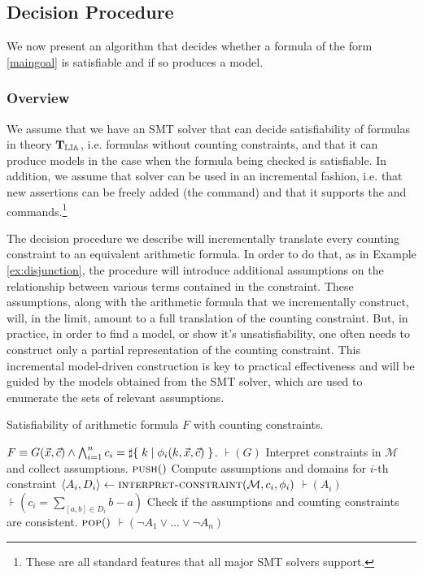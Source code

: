 \subsection{Decision Procedure}

We now present an algorithm that decides whether a formula of the form
\ref{maingoal} is satisfiable and if so produces a model.

\subsubsection{Overview}

We assume that we have an SMT solver \solver that can decide
satisfiability of formulas in theory $\operatorname{\mathbf{T}_{\mathbb{LIA}}}$, i.e. formulas without
counting constraints, and that it can produce models in the case when
the formula being checked is satisfiable. In addition, we assume that
solver \solver can be used in an incremental fashion, i.e. that new
assertions can be freely added (the \assert command) and that it
supports the \push and \pop commands.\footnote{These are all standard
features that all major SMT solvers support.}

The decision procedure we describe will incrementally translate every
counting constraint to an equivalent arithmetic formula. In order to
do that, as in Example \ref{ex:disjunction}, the procedure will
introduce additional assumptions on the relationship between various
terms contained in the constraint. These assumptions, along with the
arithmetic formula that we incrementally construct, will, in the
limit, amount to a full translation of the counting constraint. But,
in practice, in order to find a model, or show it's unsatisfiability,
one often needs to construct only a partial representation of the
counting constraint. This incremental model-driven construction is key
to practical effectiveness and will be guided by the models obtained
from the SMT solver, which are used to enumerate the sets of relevant
assumptions.

\begin{algorithm}
\caption{Satisfiability of arithmetic formula $F$ with counting constraints.}\label{arith}
\begin{algorithmic}[1]
\Require $F \equiv G(\vec{x}, \vec{c}) \land \bigwedge_{i=1}^n c_i = \sharp\lbrace\;k\;|\;\phi_i(k, \vec{x}, \vec{c})\;\rbrace$.
\State $\assert(G)$
    \LineComment Interpret constraints in $\mathcal{M}$ and collect assumptions.
    \State $\textsc{push}()$
        \LineComment Compute assumptions and domains for $i$-th constraint
        \State $\langle A_i, D_i \rangle \gets \textsc{interpret-constraint}(\mathcal{M}, c_i, \phi_i)$
        \State $\assert(A_i)$
        \State $\assert(c_i = \sum_{[a, b] \in D_i} b - a)$
    \EndFor
    \LineComment Check if the assumptions and counting constraints are consistent.
        \State {}
    \EndIf
    \State $\textsc{pop}()$
    \State $\assert(\lnot A_1 \vee \ldots \vee \lnot A_n)$
\EndWhile
\State \Return{\unsat}
\EndProcedure
\end{algorithmic}
\label{arith}
\end{algorithm}


